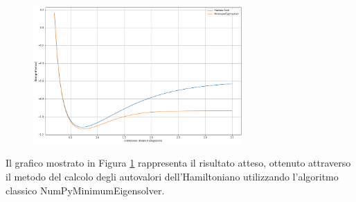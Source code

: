 \begin{figure}[htp]
    \centering
    \includegraphics[width=8cm]{Images/Capitolo3/Plots/H2_numpy_minimum_eigensolver_plot.png}
    \caption[Grafico atteso \newline H2 NumPyMinimumEigensolver.]{}
    \label{fig:numpy_minimum_eigensolver}
\end{figure}
\noindent
\newline
Il grafico mostrato in Figura \ref{fig:numpy_minimum_eigensolver} rappresenta il risultato atteso, ottenuto attraverso il metodo del calcolo degli autovalori dell'Hamiltoniano utilizzando l'algoritmo classico NumPyMinimumEigensolver.
\newline
\begin{minipage}[b]{0.39\textwidth}
    \captionsetup{type=table}
    \caption[Risultati prima simulazione.]{Nella colonna di destra sono riportati i tempi di esecuzione.}
    \label{table:notebookcpu_basicaer}
\end{minipage}
\hfill
